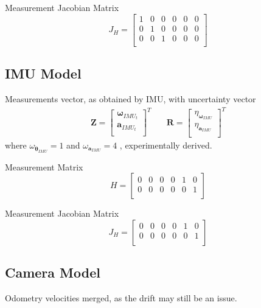 Measurement Jacobian Matrix
\begin{equation}
J_H
=
\begin{bmatrix}
1 & 0 & 0 & 0 & 0 & 0 \\
0 & 1 & 0 & 0 & 0 & 0 \\
0 & 0 & 1 & 0 & 0 & 0 \\
\end{bmatrix}
\end{equation}



\subsection{IMU Model}

\noindent
Measurements vector, as obtained by IMU, with uncertainty vector
\begin{align}
\mathbf{Z}
=
\begin{bmatrix}
\boldsymbol \omega_{IMU_t} \\
\mathbf{a}_{IMU_t} \\
\end{bmatrix}^T
& \quad
\mathbf{R}
=
\begin{bmatrix}
\eta_{\boldsymbol \omega_{IMU}} \\
\eta_{\mathbf{a}_{IMU}} \\
\end{bmatrix}^T
\end{align}
where $ \omega_{\dot{\boldsymbol \theta}_{IMU}} = 1$ and
$ \omega_{\mathbf{a}_{IMU}} = 4 $ , experimentally derived.


Measurement Matrix
\begin{equation}
H
=
\begin{bmatrix}
0 & 0 & 0 & 0 & 1 & 0 \\
0 & 0 & 0 & 0 & 0 & 1 \\
\end{bmatrix}
\end{equation}

Measurement Jacobian Matrix
\begin{equation}
J_H
=
\begin{bmatrix}
0 & 0 & 0 & 0 & 1 & 0 \\
0 & 0 & 0 & 0 & 0 & 1 \\
\end{bmatrix}
\end{equation}

\subsection{Camera Model}
\noindent 
Odometry velocities merged, as the drift may still be an issue.

